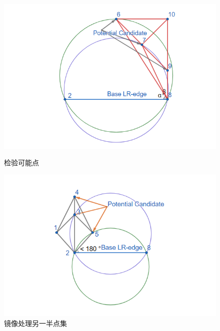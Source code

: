 \begin{figure}[htbp]
    \centering
    \begin{minipage}{0.32\textwidth}
        \centering
        \includegraphics[width=\textwidth]
        {figures/DT6.png}
        \caption{检验可能点}
        \label{DT6}
    \end{minipage}
    \begin{minipage}{0.32\textwidth}
        \centering
        \includegraphics[width=\textwidth]
        {figures/DT7.png}
        \caption{镜像处理另一半点集}
    \end{minipage}
    \begin{minipage}{0.32\textwidth}
        \centering

\end{minipage}
\end{figure}
